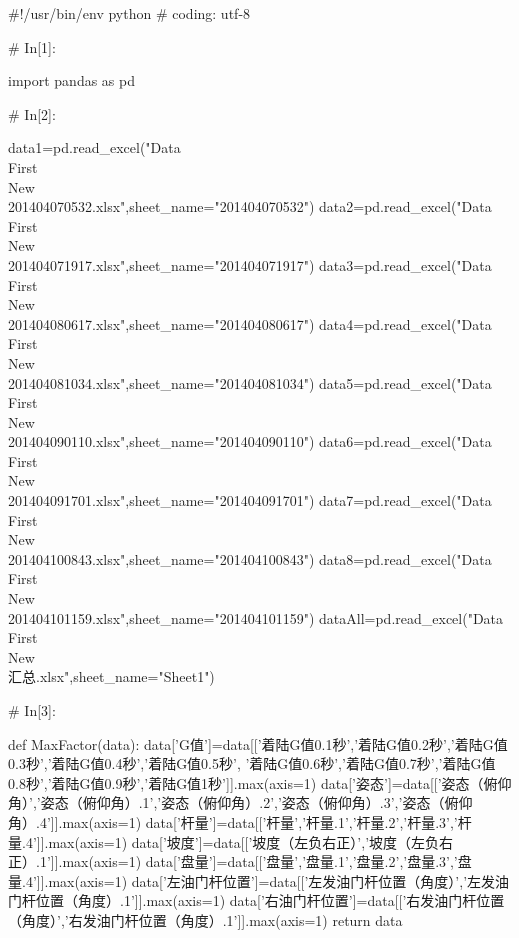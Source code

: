 \documentclass{MathorCupModeling}
\begin{document}
\begin{python}
#!/usr/bin/env python
# coding: utf-8

# In[1]:


import pandas as pd


# In[2]:


data1=pd.read_excel("Data\\First\\New\\201404070532.xlsx",sheet_name="201404070532")
data2=pd.read_excel("Data\\First\\New\\201404071917.xlsx",sheet_name="201404071917")
data3=pd.read_excel("Data\\First\\New\\201404080617.xlsx",sheet_name="201404080617")
data4=pd.read_excel("Data\\First\\New\\201404081034.xlsx",sheet_name="201404081034")
data5=pd.read_excel("Data\\First\\New\\201404090110.xlsx",sheet_name="201404090110")
data6=pd.read_excel("Data\\First\\New\\201404091701.xlsx",sheet_name="201404091701")
data7=pd.read_excel("Data\\First\\New\\201404100843.xlsx",sheet_name="201404100843")
data8=pd.read_excel("Data\\First\\New\\201404101159.xlsx",sheet_name="201404101159")
dataAll=pd.read_excel("Data\\First\\New\\汇总.xlsx",sheet_name="Sheet1")


# In[3]:


def MaxFactor(data):
    data['G值']=data[['着陆G值0.1秒','着陆G值0.2秒','着陆G值0.3秒','着陆G值0.4秒','着陆G值0.5秒',
                      '着陆G值0.6秒','着陆G值0.7秒','着陆G值0.8秒','着陆G值0.9秒','着陆G值1秒']].max(axis=1)
    data['姿态']=data[['姿态（俯仰角）','姿态（俯仰角）.1','姿态（俯仰角）.2','姿态（俯仰角）.3','姿态（俯仰角）.4']].max(axis=1)
    data['杆量']=data[['杆量','杆量.1','杆量.2','杆量.3','杆量.4']].max(axis=1)
    data['坡度']=data[['坡度（左负右正）','坡度（左负右正）.1']].max(axis=1)
    data['盘量']=data[['盘量','盘量.1','盘量.2','盘量.3','盘量.4']].max(axis=1)
    data['左油门杆位置']=data[['左发油门杆位置（角度）','左发油门杆位置（角度）.1']].max(axis=1)
    data['右油门杆位置']=data[['右发油门杆位置（角度）','右发油门杆位置（角度）.1']].max(axis=1)
    return data



\end{python}
\end{document}

